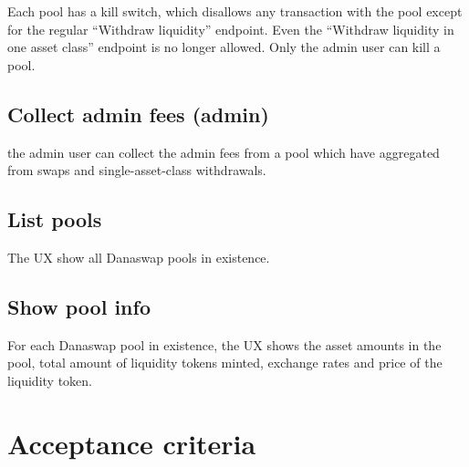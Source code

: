 \documentclass{article}
\begin{document}
Each pool has a kill switch, which disallows any transaction with the pool
except for the regular ``Withdraw liquidity'' endpoint. Even the ``Withdraw
liquidity in one asset class'' endpoint is no longer allowed. Only the admin
user can kill a pool.

\subsection*{Collect admin fees (admin)}

the admin user can collect the admin fees from a pool which have aggregated from
swaps and single-asset-class withdrawals.

\subsection*{List pools}

The UX show all Danaswap pools in existence.

\subsection*{Show pool info}

For each Danaswap pool in existence, the UX shows the asset amounts in the pool,
total amount of liquidity tokens minted, exchange rates and price of the
liquidity token.

\section{Acceptance criteria}
\end{document}
